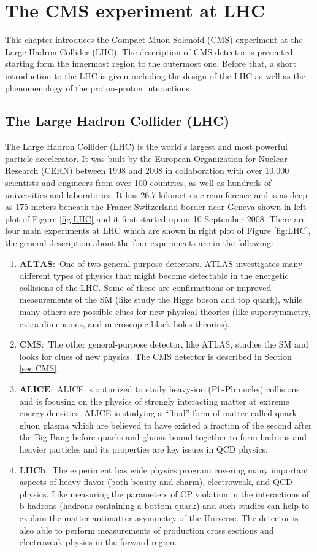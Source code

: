 \chapter{The CMS experiment at LHC}\label{chap:LHC_CMS}
This chapter introduces the Compact Muon Solenoid (CMS) experiment at the Large Hadron Collider (LHC). The description of CMS detector is presented starting form the innermost region to the outermost one. Before that, a short introduction to the LHC is given including the design of the LHC as well as the phenomenology of the proton-proton interactions.
\section{The Large Hadron Collider (LHC)}\label{sec:LHC}
The Large Hadron Collider (LHC) is the world's largest and most powerful particle accelerator. It was built by the European Organization for Nuclear Research (CERN) between 1998 and 2008 in collaboration with over 10,000 scientists and engineers from over 100 countries, as well as hundreds of universities and laboratories. It has 26.7 kilometres circumference and is as deep as 175 meters beneath the France-Switzerland border near Geneva shown in left plot of Figure \ref{fig:LHC} and it first started up on 10 September 2008. There are four main experiments at LHC which are shown in right plot of Figure \ref{fig:LHC}, the general description about the four experiments are in the following:
\begin{enumerate}
\item $\mathbf{ALTAS:}$ One of two general-purpose detectors. ATLAS investigates many different types of physics that might become detectable in the energetic collisions of the LHC. Some of these are confirmations or improved measurements of the SM (like study the Higgs boson and top quark), while many others are possible clues for new physical theories (like supersymmetry, extra dimensions, and microscopic black holes theories).
\item $\mathbf{CMS:}$ The other general-purpose detector, like ATLAS, studies the SM and looks for clues of new physics. The CMS detector is described in Section \ref{sec:CMS}.
\item $\mathbf{ALICE:}$ ALICE is optimized to study heavy-ion (Pb-Pb nuclei) collisions and is focusing on the physics of strongly interacting matter at extreme energy densities.
ALICE is studying a  ``fluid'' form of matter called quark-gluon plasma which are believed to have existed a fraction of the second after the Big Bang before quarks and gluons bound together to form hadrons and heavier particles and its properties are key issues in QCD physics.
\item $\mathbf{LHCb:}$ The experiment has wide physics program covering many important aspects of heavy flavor (both beauty and charm), electroweak, and QCD physics. Like measuring the parameters of CP violation in the interactions of b-hadrons (hadrons containing a bottom quark) and such studies can help to explain the matter-antimatter asymmetry of the Universe. The detector is also able to perform measurements of production cross sections and electroweak physics in the forward region.
\end{enumerate}

